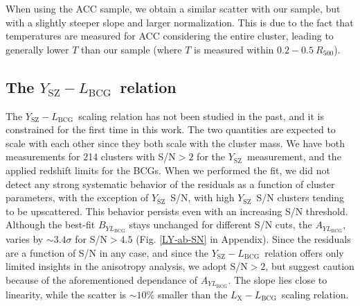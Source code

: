 \documentclass{aa}   %
\newcommand{\LxLbcg}{$L_{\text{X}}-L_{\text{BCG}}$}
\newcommand{\YLbcg}{$Y_{\text{SZ}}-L_{\text{BCG}}$}
\newcommand{\Ysz}{$Y_{\text{SZ}}$}
\begin{document}
When using the ACC sample, we obtain a similar scatter with our sample, but with a slightly steeper slope and larger normalization. This is due to the fact that temperatures are measured for ACC considering the entire cluster, leading to generally lower $T$ than our sample (where $T$ is measured within $0.2-0.5\ R_{500}$).

\subsection{The \YLbcg\ relation}

The \YLbcg\ scaling relation has not been studied in the past, and it is constrained for the first time in this work. The two quantities are expected to scale with each other since they both scale with the cluster mass. We have both measurements for 214 clusters with S/N$>2$ for the \Ysz\ measurement, and the applied redshift limits for the BCGs. When we performed the fit, we did not detect any strong systematic behavior of the residuals as a function of cluster parameters, with the exception of \Ysz\ S/N, with high \Ysz\ S/N clusters tending to be upscattered. This behavior persists even with an increasing S/N threshold. Although the best-fit $B_{YL_{\text{BCG}}}$ stays unchanged for different S/N cuts, the $A_{YL_{\text{BCG}}}$, varies by $\sim 3.4\sigma$ for S/N$>4.5$ (Fig. \ref{LY-ab-SN} in Appendix). Since the residuals are a function of S/N in any case, and since the \YLbcg\ relation offers only limited insights in the anisotropy analysis, we adopt S/N$>2$, but suggest caution because of the aforementioned dependance of $A_{YL_{\text{BCG}}}$. The slope lies close to linearity, while the scatter is $\sim 10\%$ smaller than the \LxLbcg\ scaling relation. 
\end{document}
